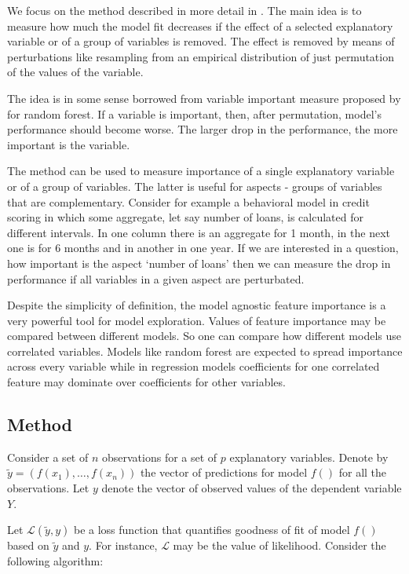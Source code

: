 \documentclass[12pt,]{krantz}
\begin{document}
We focus on the method described in more detail in \citep{variableImportancePermutations}. The main idea is to measure how much the model fit decreases if the effect of a selected explanatory variable or of a group of variables is removed. The effect is removed by means of perturbations like resampling from an empirical distribution of just permutation of the values of the variable.

The idea is in some sense borrowed from variable important measure proposed by  for random forest. If a variable is important, then, after permutation, model's performance should become worse. The larger drop in the performance, the more important is the variable.

The method can be used to measure importance of a single explanatory variable or of a group of variables. The latter is useful for aspects - groups of variables that are complementary. Consider for example a behavioral model in credit scoring in which some aggregate, let say number of loans, is calculated for different intervals. In one column there is an aggregate for 1 month, in the next one is for 6 months and in another in one year. If we are interested in a question, how important is the aspect `number of loans' then we can measure the drop in performance if all variables in a given aspect are perturbated.

Despite the simplicity of definition, the model agnostic feature importance is a very powerful tool for model exploration. Values of feature importance may be compared between different models. So one can compare how different models use correlated variables. Models like random forest are expected to spread importance across every variable while in regression models coefficients for one correlated feature may dominate over coefficients for other variables.

\hypertarget{featureImportanceMethod}{%
\subsection{Method}\label{featureImportanceMethod}}

Consider a set of \(n\) observations for a set of \(p\) explanatory variables. Denote by \(\widetilde{y}=(f(x_1),\ldots,f(x_n))\) the vector of predictions for model \(f()\) for all the observations. Let \(y\) denote the vector of observed values of the dependent variable \(Y\).

Let \(\mathcal L(\widetilde{y}, y)\) be a loss function that quantifies goodness of fit of model \(f()\) based on \(\widetilde{y}\) and \(y\). For instance, \(\mathcal L\) may be the value of likelihood. Consider the following algorithm:
\end{document}
